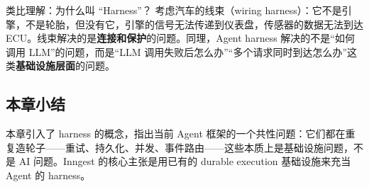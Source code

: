 \begin{knowledgebox}{类比理解：为什么叫 ``Harness''？}
考虑汽车的线束（wiring harness）：它不是引擎，不是轮胎，但没有它，引擎的信号无法传递到仪表盘，传感器的数据无法到达 ECU。线束解决的是\textbf{连接和保护}的问题。同理，Agent harness 解决的不是``如何调用 LLM''的问题，而是``LLM 调用失败后怎么办''``多个请求同时到达怎么办''这类\textbf{基础设施层面}的问题。
\end{knowledgebox}

\subsection{本章小结}

本章引入了 harness 的概念，指出当前 Agent 框架的一个共性问题：它们都在重复造轮子——重试、持久化、并发、事件路由——这些本质上是基础设施问题，不是 AI 问题。Inngest 的核心主张是用已有的 durable execution 基础设施来充当 Agent 的 harness。


